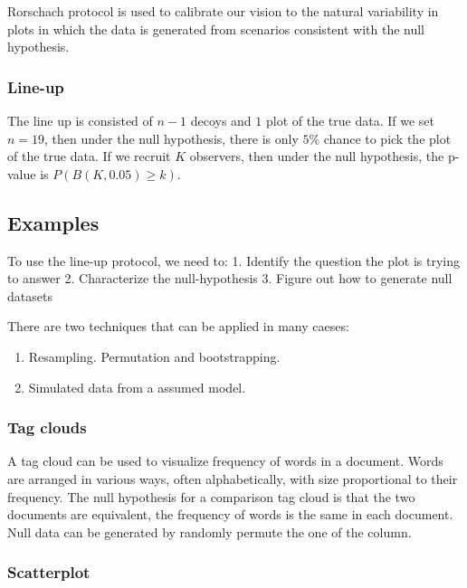 \documentclass[
]{book}
\providecommand{\tightlist}{%
  \setlength{\itemsep}{0pt}\setlength{\parskip}{0pt}}
\begin{document}
Rorschach protocol is used to calibrate our vision to the natural variability in plots in which the data is generated from scenarios consistent with the null hypothesis.

\hypertarget{line-up}{%
\subsubsection{Line-up}\label{line-up}}

The line up is consisted of \(n-1\) decoys and \(1\) plot of the true data. If we set \(n = 19\), then under the null hypothesis, there is only \(5\)\% chance to pick the plot of the true data. If we recruit \(K\) observers, then under the null hypothesis, the p-value is \(P(B(K, 0.05) \geq k)\).

\hypertarget{examples}{%
\subsection{Examples}\label{examples}}

To use the line-up protocol, we need to:
1. Identify the question the plot is trying to answer
2. Characterize the null-hypothesis
3. Figure out how to generate null datasets

There are two techniques that can be applied in many caeses:

\begin{enumerate}
\def\labelenumi{\arabic{enumi}.}
\tightlist
\item
  Resampling. Permutation and bootstrapping.
\item
  Simulated data from a assumed model.
\end{enumerate}

\hypertarget{tag-clouds}{%
\subsubsection{Tag clouds}\label{tag-clouds}}

A tag cloud can be used to visualize frequency of words in a document. Words are arranged in various ways, often alphabetically, with size proportional to their frequency. The null hypothesis for a comparison tag cloud is that the two documents are equivalent, the frequency of words is the same in each document. Null data can be generated by randomly permute the one of the column.

\hypertarget{scatterplot}{%
\subsubsection{Scatterplot}\label{scatterplot}}
\end{document}
